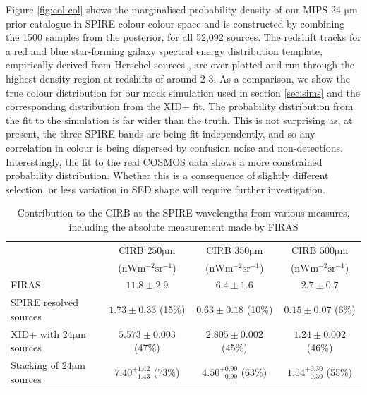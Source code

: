 \documentclass[useAMS,usenatbib]{mnras}
\begin{document}
Figure \ref{fig:col-col} shows the marginalised probability density of our MIPS 24 $\mathrm{\mu m}$ prior catalogue in SPIRE colour-colour space and is  constructed by combining the 1500 samples from the posterior, for all 52,092 sources. The redshift tracks for a red and blue star-forming galaxy spectral energy distribution template, empirically derived from Herschel sources \citep{Berta:2013}, are over-plotted and run through the highest density region at redshifts of around 2-3. As a comparison, we show the true colour distribution for our mock simulation used in section \ref{sec:sims} and the corresponding distribution from the \textsc{XID+} fit. The probability distribution from the fit to the simulation is far wider than the truth. This is not surprising as, at present, the three SPIRE bands are being fit independently, and so any correlation in colour is being dispersed by confusion noise and non-detections. Interestingly, the fit to the real COSMOS data shows a more constrained probability distribution. Whether this is a consequence of slightly different selection, or less variation in SED shape will require further investigation.



\begin{table}
\begin{tabular}{ | l || c || c || c ||}

\hline
& CIRB $250 \mathrm{\mu m}$ & CIRB $350 \mathrm{\mu m}$ & CIRB $500 \mathrm{\mu m}$ \\
& ($\mathrm{nWm^{-2}sr^{-1}}$) & ($\mathrm{nWm^{-2}sr^{-1}}$) & ($\mathrm{nWm^{-2}sr^{-1}}$) \\
\hline
FIRAS \citep{Lagache:2000}& $11.8\pm2.9$ & $6.4\pm1.6$ & $2.7\pm0.7$ \\
\hline
SPIRE resolved sources \citep{Oliver:2010}& $1.73\pm0.33$ (15\%)& $0.63\pm0.18$ (10\%)& $0.15\pm0.07$ (6\%)\\
\hline
XID+ with $24 \mathrm{\mu m}$ sources& $5.573\pm0.003$ (47\%)& $2.805\pm0.002$ (45\%)& $1.24\pm0.002$ (46\%)\\
\hline
Stacking of $24 \mathrm{\mu m}$ sources \citep{Bethermin:2012}& $7.40^{+1.42}_{-1.43}$ (73\%)& $4.50^{+0.90}_{-0.90}$ (63\%)& $1.54^{+0.30}_{-0.30}$ (55\%)\\
\hline
\end{tabular}
\caption{Contribution to the CIRB at the SPIRE wavelengths from various measures, including the absolute measurement made by FIRAS}\label{tab:cirb}
\end{table}
\end{document}
